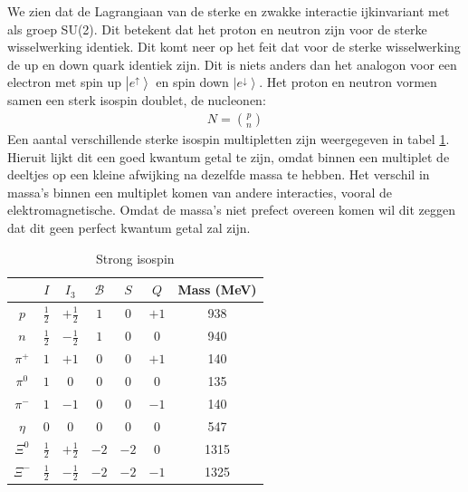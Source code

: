 \documentclass[../main.tex]{subfiles}
\begin{document}
We zien dat de Lagrangiaan van de sterke en zwakke interactie ijkinvariant met als groep SU(2). Dit betekent dat het proton en neutron zijn voor de sterke wisselwerking identiek. Dit komt neer op het feit dat voor de sterke wisselwerking de up en down quark identiek zijn. Dit is niets anders dan het analogon voor een electron met spin up $\left|e^\uparrow\right>$ en spin down $\left|e^\downarrow\right>$. Het proton en neutron vormen samen een sterk isospin doublet, de nucleonen:
\begin{equation}
    \begin{aligned}
        \label{eq:nucleonen}
        N = \binom{p}{n}
    \end{aligned}
\end{equation}
Een aantal verschillende sterke isospin multipletten zijn weergegeven in tabel \ref{tab:strong_isospin}. Hieruit lijkt dit een goed kwantum getal te zijn, omdat binnen een multiplet de deeltjes op een kleine afwijking na dezelfde massa te hebben. Het verschil in massa's binnen een multiplet komen van andere interacties, vooral de elektromagnetische. Omdat de massa's niet prefect overeen komen wil dit zeggen dat dit geen perfect kwantum getal zal zijn.

\begin{table}[h]
    \centering
    \caption{Strong isospin}
    \label{tab:strong_isospin}
    \begin{tabular}{c||cc|c|c|c|c}
                & $I$           & $I_3$         & $\mathcal{B}$ & $S$   & $Q$   & Mass (MeV)\\
        \hline
        $p$     & $\frac{1}{2}$ & $+\frac{1}{2}$& $1$           & $0$   & $+1$  & 938       \\
        $n$     & $\frac{1}{2}$ & $-\frac{1}{2}$& $1$           & $0$   & $0$   & 940       \\
        \hline
        $\pi^+$ & $1$           & $+1$          & $0$           & $0$   & $+1$  & 140       \\
        $\pi^0$ & $1$           & $0$           & $0$           & $0$   & $0$   & 135       \\
        $\pi^-$ & $1$           & $-1$          & $0$           & $0$   & $-1$  & 140       \\
        \hline
        $\eta$  & $0$           & $0$           & $0$           & $0$   & $0$   & 547       \\
        \hline
        $\Xi^0$ & $\frac{1}{2}$ & $+\frac{1}{2}$& $-2$          & $-2$  & $0$   & 1315      \\
        $\Xi^-$ & $\frac{1}{2}$ & $-\frac{1}{2}$& $-2$          & $-2$  & $-1$  & 1325      \\
    \end{tabular}
\end{table}
\end{document}
